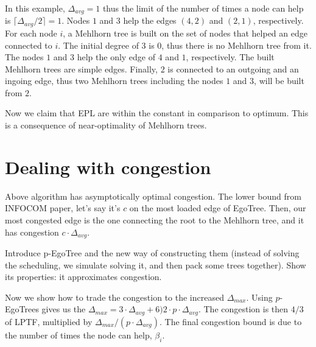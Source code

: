 \documentclass{article}
\begin{document}
In this example, $\Delta_{avg} = 1$ thus the limit of the number of times a node can help
is $\lceil\Delta_{avg}/2\rceil = 1$. 
Nodes $1$ and $3$ help the edges $(4,2)$ and $(2,1)$, respectively.
For each node $i$, a Mehlhorn tree is built on the set of nodes that
helped an edge connected to $i$.
The initial degree of $3$ is $0$, thus there is no Mehlhorn tree from it.
The nodes $1$ and $3$ help the only edge of $4$ and $1$, respectively.
The built Mehlhorn trees are simple edges.
Finally, $2$ is connected to an outgoing and an ingoing edge, thus two
Mehlhorn trees including the nodes $1$ and $3$, will be built from $2$.


Now we claim that EPL are within the constant in comparison to optimum.
This is a consequence of near-optimality of Mehlhorn trees.

\section{Dealing with congestion}

Above algorithm has asymptotically optimal congestion.
The lower bound from INFOCOM paper, let's say it's $c$ on the most loaded edge of EgoTree.
Then, our most congested edge is the one connecting the root to the Mehlhorn tree, and it has congestion $c \cdot \Delta_{avg}$.

Introduce p-EgoTree and the new way of constructing them (instead of solving the scheduling, we simulate solving it, and then pack some trees together).
Show its properties: it approximates congestion.

Now we show how to trade the congestion to the increased $\Delta_{max}$.
Using $p$-EgoTrees gives us the $\Delta_{max} = 3\cdot \Delta_{avg} + 6 ) 2 \cdot p \cdot \Delta_{avg}$.
The congestion is then $4/3$ of LPTF, multiplied by $\Delta_{max} / (p \cdot \Delta_{avg})$.
The final congestion bound is due to the number of times the node can help, $\beta_i$.
\end{document}
